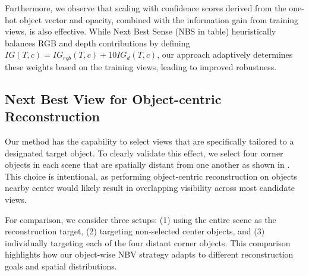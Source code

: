Furthermore, we observe that scaling with confidence scores derived from the one-hot object vector and opacity, combined with the information gain from training views, is also effective. While Next Best Sense \cite{strong2024next} (NBS in table) heuristically balances RGB and depth contributions by defining $IG(T,c) = IG_{rgb}(T,c) + 10 IG_{d}(T,c)$, our approach adaptively determines these weights based on the training views, leading to improved robustness.




\subsection{Next Best View for Object-centric Reconstruction}


Our method has the capability to select views that are specifically tailored to a designated target object. To clearly validate this effect, we select four corner objects in each scene that are spatially distant from one another as shown in . This choice is intentional, as performing object-centric reconstruction on objects nearby center would likely result in overlapping visibility across most candidate views. 


For comparison, we consider three setups: (1) using the entire scene as the reconstruction target, (2) targeting non-selected center objects, and (3) individually targeting each of the four distant corner objects. This comparison highlights how our object-wise \ac{NBV} strategy adapts to different reconstruction goals and spatial distributions.

